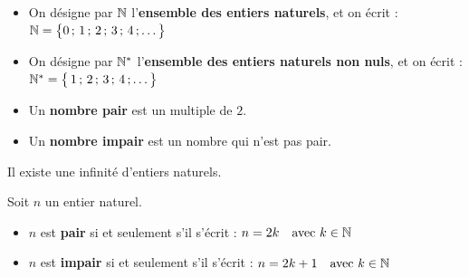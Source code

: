 \documentclass[10pt, a4paper]{article}
\begin{document}
\begin{Definition}[]
\begin{itemize}[leftmargin=*,itemsep=0.5pt]
    \item On désigne par $\mathbb{N}$ l'\textbf{ensemble des entiers naturels}, et on écrit :
$\mathbb{N} = \big\{0\,;\,1\,;\,2\,;\,3\,;\,4\,;\ldots\big\}$
    
    \item On désigne par $\mathbb{N}^*$ l'\textbf{ensemble des entiers naturels non nuls}, et on écrit :
$\mathbb{N}^* = \big\{\,1\,;\,2\,;\,3\,;\,4\,;\ldots\big\}$
\end{itemize}
\end{Definition}



\begin{Definition}[]
\begin{itemize}[leftmargin=*,itemsep=0.5pt]
  \item Un \textbf{nombre pair} est un multiple de $2$.
  \item Un \textbf{nombre impair} est un nombre qui n'est pas pair.
\end{itemize}
\end{Definition}



\begin{Remarque}
   Il existe une infinité d'entiers naturels.
\end{Remarque}

\begin{Propriete} Soit $n$ un entier naturel.
\begin{itemize}[leftmargin=*,itemsep=0.5pt]
    \item $n$ est \textbf{pair} si et seulement s'il s'écrit :
$n = 2k \quad \text{avec } k \in \mathbb{N}$

    \item $n$ est \textbf{impair} si et seulement s'il s'écrit :
$n = 2k + 1 \quad \text{avec } k \in \mathbb{N}$
\end{itemize}
\end{Propriete}
\end{document}
